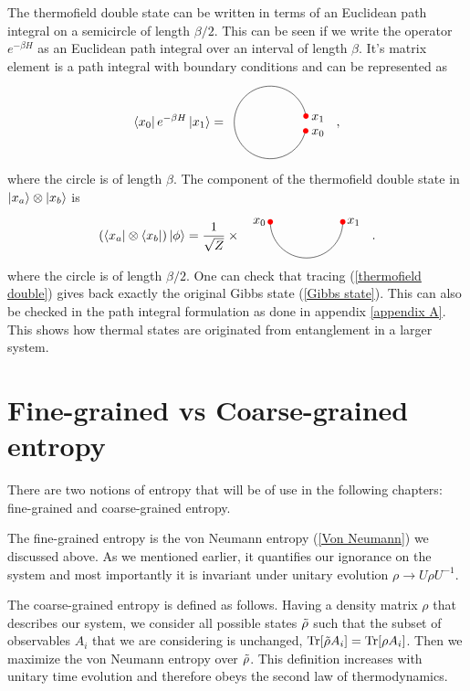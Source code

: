 The thermofield double state can be written in terms of an Euclidean path integral on a semicircle of length $\beta/2$. This can be seen if we write the operator $e^{-\beta H}$ as an Euclidean path integral over an interval of length $\beta$. It's matrix element is a path integral with boundary conditions and can be represented as
\begin{equation}\label{l3iba}
    \bra{x_0}e^{-\beta H}\ket{x_1} = \ctikz{\draw (0.967,0.255) arc (10:350:1);\node at (0.967,0.255) [circle,fill=red,inner sep=1.5pt]{}; \node at (0.96,-0.150) [circle,fill=red,inner sep=1.5pt]{};
    \draw node at (1.3,-0.2){$x_0$};\draw node at (1.3,0.2){$x_1$};},
\end{equation}
where the circle is of length $\beta$. The component of the thermofield double state in $\ket{x_a}\otimes\ket{x_b}$ is
\begin{equation}
    \left(\bra{x_a}\otimes\bra{x_b}\right)\ket{\phi} = \frac1{\sqrt{Z}} \times \ctikz{\draw (-1,0) arc (180:360:1);\node at (-1,0) [circle,fill=red,inner sep=1.5pt]{}; \node at (1,0) [circle,fill=red,inner sep=1.5pt]{};
    \draw node at (-1.3,0){$x_0$};\draw node at (1.3,0){$x_1$};}.
\end{equation}
where the circle is of length $\beta/2$. One can check that tracing (\ref{thermofield double}) gives back exactly the original Gibbs state (\ref{Gibbs state}). This can also be checked in the path integral formulation as done in appendix \ref{appendix A}. This shows how thermal states are originated from entanglement in a larger system.

\section{Fine-grained vs Coarse-grained entropy}

There are two notions of entropy that will be of use in the following chapters: fine-grained and coarse-grained entropy.

The fine-grained entropy is the von Neumann entropy (\ref{Von Neumann}) we discussed above. As we mentioned earlier, it quantifies our ignorance on the system and most importantly it is invariant under unitary evolution $\rho\rightarrow U\rho U^{-1}$.

The coarse-grained entropy is defined as follows. Having a density matrix $\rho$ that describes our system, we consider all possible states $\Tilde{\rho}$ such that the subset of observables $A_i$ that we are considering is unchanged, $\text{Tr}[\Tilde{\rho}A_i]=\text{Tr}[\rho A_i]$. Then we maximize the von Neumann entropy over $\Tilde{\rho}$. This definition increases with unitary time evolution and therefore obeys the second law of thermodynamics. 

